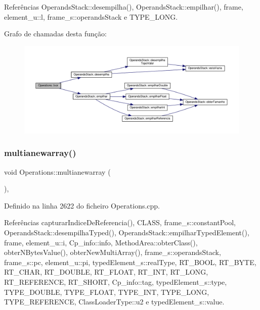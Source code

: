 Referências Operands\+Stack\+::desempilha(), Operands\+Stack\+::empilhar(), frame, element\+\_\+u\+::l, frame\+\_\+s\+::operands\+Stack e T\+Y\+P\+E\+\_\+\+L\+O\+NG.

Grafo de chamadas desta função\+:
\nopagebreak
\begin{figure}[H]
\begin{center}
\leavevmode
\includegraphics[width=350pt]{classOperations_ac135e723f1ac6a27c736e6b8e7d06a45_cgraph}
\end{center}
\end{figure}
\mbox{\label{classOperations_a78c45edfcdf63668974ffc3b2d84a309}} 
\subsubsection{\texorpdfstring{multianewarray()}{multianewarray()}}
{\footnotesize\ttfamily void Operations\+::multianewarray (\begin{DoxyParamCaption}{ }\end{DoxyParamCaption})\hspace{0.3cm}{\ttfamily [static]}, {\ttfamily [private]}}



Definido na linha 2622 do ficheiro Operations.\+cpp.



Referências capturar\+Indice\+De\+Referencia(), C\+L\+A\+SS, frame\+\_\+s\+::constant\+Pool, Operands\+Stack\+::desempilha\+Typed(), Operands\+Stack\+::empilhar\+Typed\+Element(), frame, element\+\_\+u\+::i, Cp\+\_\+info\+::info, Method\+Area\+::obter\+Class(), obter\+N\+Bytes\+Value(), obter\+New\+Multi\+Array(), frame\+\_\+s\+::operands\+Stack, frame\+\_\+s\+::pc, element\+\_\+u\+::pi, typed\+Element\+\_\+s\+::real\+Type, R\+T\+\_\+\+B\+O\+OL, R\+T\+\_\+\+B\+Y\+TE, R\+T\+\_\+\+C\+H\+AR, R\+T\+\_\+\+D\+O\+U\+B\+LE, R\+T\+\_\+\+F\+L\+O\+AT, R\+T\+\_\+\+I\+NT, R\+T\+\_\+\+L\+O\+NG, R\+T\+\_\+\+R\+E\+F\+E\+R\+E\+N\+CE, R\+T\+\_\+\+S\+H\+O\+RT, Cp\+\_\+info\+::tag, typed\+Element\+\_\+s\+::type, T\+Y\+P\+E\+\_\+\+D\+O\+U\+B\+LE, T\+Y\+P\+E\+\_\+\+F\+L\+O\+AT, T\+Y\+P\+E\+\_\+\+I\+NT, T\+Y\+P\+E\+\_\+\+L\+O\+NG, T\+Y\+P\+E\+\_\+\+R\+E\+F\+E\+R\+E\+N\+CE, Class\+Loader\+Type\+::u2 e typed\+Element\+\_\+s\+::value.

